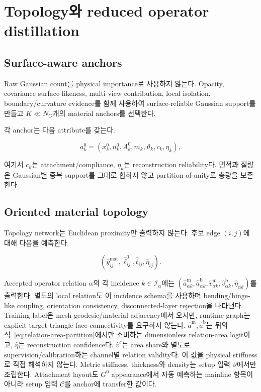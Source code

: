 \documentclass[11pt,a4paper]{article}
\begin{document}
\section{Topology와 reduced operator distillation}

\subsection{Surface-aware anchors}

Raw Gaussian count를 physical importance로 사용하지 않는다.
Opacity, covariance surface-likeness, multi-view contribution,
local isolation, boundary/curvature evidence를 함께 사용하여
surface-reliable Gaussian support를 만들고 \(K\ll N_G\)개의 material anchors를 선택한다.

각 anchor는 다음 attribute를 갖는다.

\begin{equation}
  a_k^0
  =
  \left(
  x_k^0,n_k^0,A_k^0,m_k,
  \vartheta_k,c_k,\eta_k
  \right),
\end{equation}

여기서 \(c_k\)는 attachment/compliance,
\(\eta_k\)는 reconstruction reliability다.
면적과 질량은 Gaussian별 중복 support를 그대로 합하지 않고
partition-of-unity로 총량을 보존한다.

\subsection{Oriented material topology}

Topology network는 Euclidean proximity만 출력하지 않는다.
후보 edge \((i,j)\)에 대해 다음을 예측한다.

\begin{equation}
  (\widehat y_{ij}^{\mathrm{mat}},
   \widehat \ell_{ij}^0,
   \widehat t_{ij},
   \widehat\eta_{ij}).
\end{equation}

Accepted operator relation \(\alpha\)의 각 incidence \(k\in\mathcal I_\alpha\)에는
\((\widehat a_{\alpha k}^{\mathrm m},\widehat a_{\alpha k}^{\mathrm b},
\widehat v_{\alpha k}^{\mathrm m},\widehat v_{\alpha k}^{\mathrm b},
\widehat\eta_{\alpha k})\)를 출력한다.
별도의 local relation도 이 incidence schema를 사용하며 bending/hinge-like coupling,
orientation consistency, disconnected-layer rejection을 나타낸다.
Training label은 mesh geodesic/material adjacency에서 오지만,
runtime graph는 explicit target triangle face connectivity를 요구하지 않는다.
\(\widehat a^{\mathrm m},\widehat a^{\mathrm b}\)는 뒤의
식~\eqref{eq:relation-area-partition}에서만 소비하는
dimensionless relation-area logit이고, \(\widehat\eta\)는 reconstruction confidence다.
\(\widehat v^{c}\)는 area share와 별도로 supervision/calibration하는 channel별 relation validity다.
이 값을 physical stiffness로 직접 해석하지 않는다.
Metric stiffness, thickness와 density는 setup 입력 \(\vartheta\)에서만 조립한다.
Attachment layout도 \(G^0\) appearance에서 자동 예측하는 mainline 항목이 아니라
setup 입력 \(\mathcal C\)를 anchor에 transfer한 값이다.
\end{document}
